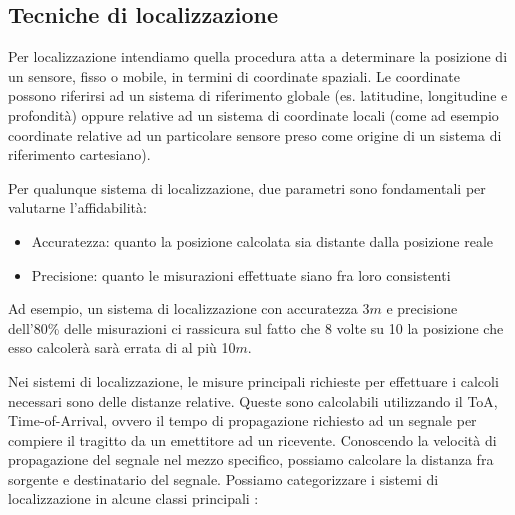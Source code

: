 \documentclass[Lau,binding=0.6cm]{sapthesis}
\begin{document}
\subsection{Tecniche di localizzazione}
Per localizzazione intendiamo quella procedura atta a determinare la posizione di un sensore, fisso o mobile, in termini di coordinate spaziali. Le coordinate possono riferirsi ad un sistema di riferimento globale (es. latitudine, longitudine e profondità) oppure relative ad un sistema di coordinate locali (come ad esempio coordinate relative ad un particolare sensore preso come origine di un sistema di riferimento cartesiano).
\par
Per qualunque sistema di localizzazione, due parametri sono fondamentali per valutarne l'affidabilità:
\begin{itemize}
    \item Accuratezza: quanto la posizione calcolata sia distante dalla posizione reale
    \item Precisione: quanto le misurazioni effettuate siano fra loro consistenti
\end{itemize}
Ad esempio, un sistema di localizzazione con accuratezza 3$m$  e precisione dell'80\% delle misurazioni ci rassicura sul fatto che 8 volte su 10 la posizione che esso calcolerà sarà errata di al più 10$m$.
\par
Nei sistemi di localizzazione, le misure principali richieste per effettuare i calcoli necessari sono delle distanze relative. Queste sono calcolabili utilizzando il ToA, Time-of-Arrival, ovvero il tempo di propagazione richiesto ad un segnale per compiere il tragitto da un emettitore ad un ricevente. Conoscendo la velocità di propagazione del segnale nel mezzo specifico, possiamo calcolare la distanza fra sorgente e destinatario del segnale.
Possiamo categorizzare i sistemi di localizzazione in alcune classi principali \cite{trilateration}:
\end{document}
